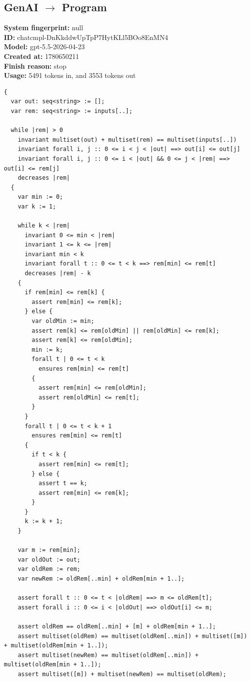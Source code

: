 \documentclass{article}
\begin{document}
\subsection*{GenAI $\rightarrow$ Program}
\textbf{System fingerprint: }null
\\\textbf{ID: }chatcmpl-DnKkddwUpTpP7HytKLl5BOo8EnMN4
\\\textbf{Model: }gpt-5.5-2026-04-23
\\\textbf{Created at: }1780650211
\\\textbf{Finish reason: }stop
\\\textbf{Usage: }5491 tokens in, and 3553 tokens out
\begin{lstlisting}
{
  var out: seq<string> := [];
  var rem: seq<string> := inputs[..];

  while |rem| > 0
    invariant multiset(out) + multiset(rem) == multiset(inputs[..])
    invariant forall i, j :: 0 <= i < j < |out| ==> out[i] <= out[j]
    invariant forall i, j :: 0 <= i < |out| && 0 <= j < |rem| ==> out[i] <= rem[j]
    decreases |rem|
  {
    var min := 0;
    var k := 1;

    while k < |rem|
      invariant 0 <= min < |rem|
      invariant 1 <= k <= |rem|
      invariant min < k
      invariant forall t :: 0 <= t < k ==> rem[min] <= rem[t]
      decreases |rem| - k
    {
      if rem[min] <= rem[k] {
        assert rem[min] <= rem[k];
      } else {
        var oldMin := min;
        assert rem[k] <= rem[oldMin] || rem[oldMin] <= rem[k];
        assert rem[k] <= rem[oldMin];
        min := k;
        forall t | 0 <= t < k
          ensures rem[min] <= rem[t]
        {
          assert rem[min] <= rem[oldMin];
          assert rem[oldMin] <= rem[t];
        }
      }
      forall t | 0 <= t < k + 1
        ensures rem[min] <= rem[t]
      {
        if t < k {
          assert rem[min] <= rem[t];
        } else {
          assert t == k;
          assert rem[min] <= rem[k];
        }
      }
      k := k + 1;
    }

    var m := rem[min];
    var oldOut := out;
    var oldRem := rem;
    var newRem := oldRem[..min] + oldRem[min + 1..];

    assert forall t :: 0 <= t < |oldRem| ==> m <= oldRem[t];
    assert forall i :: 0 <= i < |oldOut| ==> oldOut[i] <= m;

    assert oldRem == oldRem[..min] + [m] + oldRem[min + 1..];
    assert multiset(oldRem) == multiset(oldRem[..min]) + multiset([m]) + multiset(oldRem[min + 1..]);
    assert multiset(newRem) == multiset(oldRem[..min]) + multiset(oldRem[min + 1..]);
    assert multiset([m]) + multiset(newRem) == multiset(oldRem);


\end{lstlisting}
\end{document}
